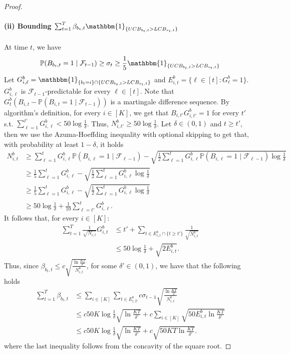 \begin{proof}
    \paragraph{(ii) Bounding $\sum_{t=1}^T\betab \mathbbm{1}_{\{\ucbb > LCB_{v_{t},t}\}}$}
    At time $t$, we have 
     \begin{align*}
         \mathbb{P}(B_{b_t,t} = 1 \mid \mathcal{F}_{t-1} ) \ge \sigma_{t}\ge \frac{1}{5}\mathbbm{1}_{\{\ucbb > LCB_{v_{t},t}\}}
     \end{align*}
    Let $G_{i,\ell}^b = \mathbbm{1}_{\{b_l = i\} \cap \{\ucbb > LCB_{v_{t},t}\}}$ and $E_{i,t}^b = \{ \ell \in [t] :  G_\ell^b=1\}$. $G_{i,\ell}^b$ is $\mathcal{F}_{t-1}$-predictable for every $\ell \in [t]$. Note that $G_t^b (B_{i,t}-\mathbb{P}(B_{i,t} = 1 \mid \mathcal{F}_{t-1} ))$ is a martingale difference sequence. By algorithm's definition, for every $i \in [K]$, we get that $B_{i,t'}G_{i,t'}^b = 1$ for every $t'$ s.t. $\sum_{\ell=1}^{t'} G_{i,\ell}^b < 50\log \frac{1}{\delta}$. Thus, $N_{i,t'}^b \ge 50\log \frac{1}{\delta}$. Let $\delta \in (0,1)$ and $t \ge t'$, then we use the Azuma-Hoeffding inequality with optional skipping to get that, with probability at least $1-\delta$, it holds
    \begin{align*}
        N_{i,t}^b &\ge \sum_{\ell=1}^t G_{i, \ell}^b\mathbb{P}\left(B_{i,\ell} = 1 \mid \mathcal{F}_{\ell-1}\right) - \sqrt{\frac{1}{2} \sum_{\ell=1}^t G_{i, \ell}^b\mathbb{P}\left(B_{i,\ell} = 1 \mid \mathcal{F}_{\ell-1}\right)\log \frac{1}{\delta}} \\
        &\ge \frac{1}{5}\sum_{\ell=1}^t G_{i, \ell}^b - \sqrt{\frac{1}{2} \sum_{\ell=1}^t G_{i, \ell}^b\log \frac{1}{\delta}}\\
        &\ge \frac{1}{5}\sum_{\ell=1}^t G_{i, \ell}^b - \sqrt{\frac{1}{2} \sum_{\ell=1}^t G_{i, \ell}^b\log \frac{1}{\delta}}\\
        &\ge 50\log \frac{1}{\delta} + \frac{1}{10}\sum_{\ell=t'}^t G_{i, \ell}^b.
    \end{align*}
    It follows that, for every $i \in [K]$:
    \begin{align*}
        \sum_{t =1}^T\frac{1}{\sqrt{N_{i,t}}}G_{i,t}^b &\le t' + \sum_{t \in E_{i,t}^b \cap \{t\ge t'\}}\frac{1}{\sqrt{N_{i,t}^b}} \\
        &\le  50\log \frac{1}{\delta}+ \sqrt{2 E_{i,t}^b}.
    \end{align*}
    Thus, since $\beta_{b_t,t} \le c\sqrt{\frac{\ln \frac{KT}{\delta'}}{N_{i,t}^b}}$, for some $\delta' \in (0,1)$, we have that the following holds
    \begin{align*}
        \sum_{t=1}^T \beta_{b_t,t} &\le \sum_{i \in [K]} \sum_{t \in E_{i,T}^b} c\sigma_{t-1}\sqrt{\frac{\ln \frac{KT}{\delta'}}{N_{i,t}^b}}  \\
        &\le c50K\log \frac{1}{\delta} \sqrt{ \ln \frac{KT}{\delta'}} + c\sum_{i \in [K]}\sqrt{50 E_{i,t}^b \ln \frac{KT}{\delta'}} \\
        &\le c50K\log \frac{1}{\delta} \sqrt{\ln \frac{KT}{\delta'}} + c\sqrt{50 KT \ln \frac{KT}{\delta'}} .
    \end{align*}
    where the last inequality follows from the concavity of the square root.

\end{proof}
